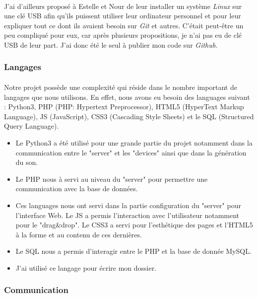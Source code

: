 \documentclass[12pt]{article}
\begin{document}
	\paragraph{}
	J'ai d'ailleurs proposé à Estelle et Nour de leur installer un système \textit{Linux} sur une clé USB afin qu'ils puissent utiliser leur ordinateur personnel et pour leur expliquer tout ce dont ils avaient besoin sur \textit{Git} et autres. C'était peut-être un peu compliqué pour eux, car après plusieurs propositions, je n'ai pas eu de clé USB de leur part. J'ai donc été le seul à publier mon code sur \textit{Github}.
	\subsubsection{Langages}
	\paragraph{}
	Notre projet possède une complexité qui réside dans le nombre important de langages que nous utilisons. En effet, nous avons eu besoin des languages suivant : Python3, PHP (PHP: Hypertext Preprocessor), HTML5 (HyperText Markup Language), JS (JavaScript), CSS3 (Cascading Style Sheets) et le SQL (Structured Query Language).
	
	\begin{itemize}
		\item[\textbf{Python3}] Le Python3 a été utilisé pour une grande partie du projet notamment dans la communication entre le "server" et les "devices" ainsi que dans la génération du son.
		\item[\textbf{PHP}] Le PHP nous à servi au niveau du "server" pour permettre une communication avec la base de données. 
		\item[\textbf{HTML5, JS, CSS3}] Ces languages nous ont servi dans la partie configuration du "server" pour l'interface Web. Le JS a permis l'interaction avec l'utilisateur notamment pour le "drag\&drop". Le CSS3 a servi pour l'esthétique des pages et l'HTML5 à la forme et au contenu de ces dernières.
		\item [\textbf{SQL}] Le SQL nous a permis d'interagir entre le PHP et la base de donnée MySQL.
		\item[\textbf{\LaTeX}] J'ai utilisé ce langage pour écrire mon dossier.
	\end{itemize}
	\subsubsection{Communication}
\end{document}
